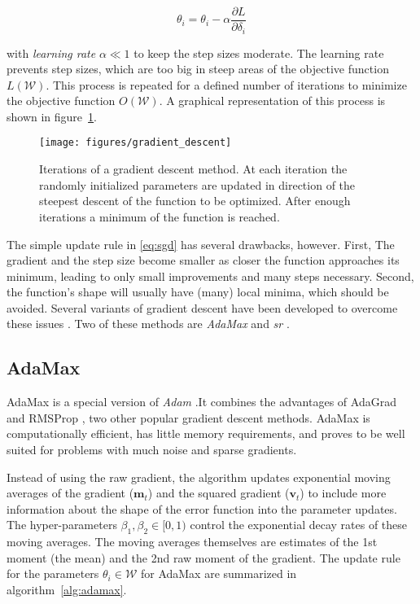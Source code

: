\begin{equation}
    \label{eq:sgd}
    \theta_i = \theta_i - \alpha \frac{\partial L}{\partial \delta_i}
\end{equation}

with \textit{learning rate} $\alpha \ll 1$ to keep the step sizes moderate. The learning rate prevents step sizes, which are too big in steep 
areas of the objective function $L(\mathcal{W})$.
This process is repeated for a defined number of iterations to minimize the objective function $O(\mathcal{W})$.
A graphical representation of this process is shown in figure~\ref{fig:sgd}.

\begin{figure}[H]
  \centering
  \texttt{[image: figures/gradient\_descent]}
  \caption[Gradient Descent]{Iterations of a gradient descent method. At each iteration the randomly initialized parameters are updated in 
   direction of the steepest descent of the function to be optimized. After enough iterations a minimum of the function is reached.}
  \label{fig:sgd} 
\end{figure}
 
The simple update rule in \ref{eq:sgd} has several drawbacks, however. First, The gradient and the step size become smaller as closer the function approaches its minimum, leading to only small improvements and many steps necessary.
Second, the function's shape will usually have (many) local minima, which should be avoided.
Several variants of gradient descent have been developed to overcome these issues \cite{ruder2016overview}.
Two of these methods are \textit{AdaMax} \cite{ruder2016overview} and \textit{\gls{sr}} \cite{sorella1998green}.

\subsection{AdaMax}
AdaMax is a special version 
of \textit{Adam} \cite{kingma2014adam}.It combines the advantages of AdaGrad \cite{duchi2011adaptive} and RMSProp \cite{bengio2015rmsprop},
two other popular gradient descent methods. AdaMax is computationally efficient, has little
memory requirements, and proves to be well suited for problems with much noise and sparse gradients.

Instead of using the raw gradient, the algorithm updates exponential moving averages of the gradient ($\bm{m}_t$) and the squared gradient
($\bm{v}_t$) to include more information about the shape of the error function into the parameter updates. The hyper-parameters $\beta_1, \beta_2 \in [0, 1)$ control the exponential decay rates of these moving
averages. The moving averages themselves are estimates of the 1st moment (the mean) and the
2nd raw moment of the gradient. The update rule for the parameters $\theta_{i} \in \mathcal{W}$ for AdaMax are summarized in 
algorithm~\ref{alg:adamax}.

